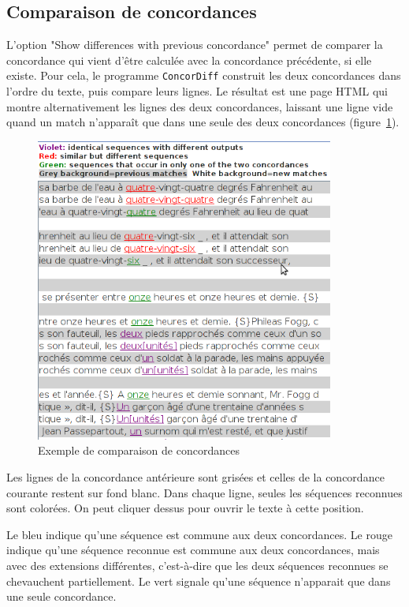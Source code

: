 \subsection{Comparaison de concordances}
\label{section-comparing-concordances}
L’option "Show differences with previous concordance" permet de comparer la concordance
qui vient d’être calculée avec la concordance précédente, si elle existe. Pour cela, le programme
\verb+ConcorDiff+ construit les deux concordances dans l’ordre du texte, puis compare leurs lignes.
Le résultat est une page HTML qui montre alternativement les lignes des deux concordances, laissant
une ligne vide quand un match n'apparaît que dans une seule des deux concordances (figure~\ref{fig-concordiff}).

\begin{figure}[h]
\begin{center}
\includegraphics[height=10cm]{resources/img/fig6-33.png}
\caption{Exemple de comparaison de concordances\label{fig-concordiff}}
\end{center}
\end{figure}

\bigskip
\noindent Les lignes de la
concordance antérieure sont grisées et celles de la concordance courante restent sur fond blanc.
Dans chaque ligne, seules les séquences reconnues sont colorées. On peut cliquer dessus pour
ouvrir le texte à cette position.

\bigskip
\noindent Le bleu indique qu'une séquence est commune aux deux concordances. Le rouge indique qu'une séquence
reconnue est commune aux deux concordances, mais avec des extensions différentes, c'est-à-dire que les
deux séquences reconnues se chevauchent partiellement. Le vert signale qu'une séquence n'apparait
que dans une seule concordance.

